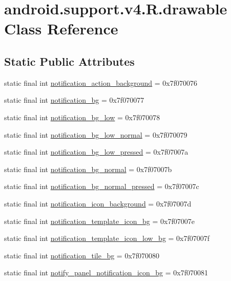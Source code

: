 \hypertarget{classandroid_1_1support_1_1v4_1_1_r_1_1drawable}{}\section{android.\+support.\+v4.\+R.\+drawable Class Reference}
\label{classandroid_1_1support_1_1v4_1_1_r_1_1drawable}
\subsection*{Static Public Attributes}
\begin{DoxyCompactItemize}
\item 
static final int \mbox{\hyperlink{classandroid_1_1support_1_1v4_1_1_r_1_1drawable_a1c5ea12cd4bf083ceae928a72012a29d}{notification\+\_\+action\+\_\+background}} = 0x7f070076
\item 
static final int \mbox{\hyperlink{classandroid_1_1support_1_1v4_1_1_r_1_1drawable_a0d0d6a26167a46b4f5473be51838a398}{notification\+\_\+bg}} = 0x7f070077
\item 
static final int \mbox{\hyperlink{classandroid_1_1support_1_1v4_1_1_r_1_1drawable_ab0f27bdda695d0483467980ff9046e64}{notification\+\_\+bg\+\_\+low}} = 0x7f070078
\item 
static final int \mbox{\hyperlink{classandroid_1_1support_1_1v4_1_1_r_1_1drawable_a1e4034a8000089da45523a4dc7e7d9cc}{notification\+\_\+bg\+\_\+low\+\_\+normal}} = 0x7f070079
\item 
static final int \mbox{\hyperlink{classandroid_1_1support_1_1v4_1_1_r_1_1drawable_a5cf6c1f75adafe5591e10e3f69fbfe97}{notification\+\_\+bg\+\_\+low\+\_\+pressed}} = 0x7f07007a
\item 
static final int \mbox{\hyperlink{classandroid_1_1support_1_1v4_1_1_r_1_1drawable_aaba29d4510a5dd4a4595e2aedb7c4984}{notification\+\_\+bg\+\_\+normal}} = 0x7f07007b
\item 
static final int \mbox{\hyperlink{classandroid_1_1support_1_1v4_1_1_r_1_1drawable_a5307ce5ac425f1c9e26198d2cb916bad}{notification\+\_\+bg\+\_\+normal\+\_\+pressed}} = 0x7f07007c
\item 
static final int \mbox{\hyperlink{classandroid_1_1support_1_1v4_1_1_r_1_1drawable_a15cc24da0548b407fa8a5ebb927077dd}{notification\+\_\+icon\+\_\+background}} = 0x7f07007d
\item 
static final int \mbox{\hyperlink{classandroid_1_1support_1_1v4_1_1_r_1_1drawable_afa9eae4b4d22f976ab7ed0d53cc43d96}{notification\+\_\+template\+\_\+icon\+\_\+bg}} = 0x7f07007e
\item 
static final int \mbox{\hyperlink{classandroid_1_1support_1_1v4_1_1_r_1_1drawable_abdbd483972efa7e83398fbc6174f0e9e}{notification\+\_\+template\+\_\+icon\+\_\+low\+\_\+bg}} = 0x7f07007f
\item 
static final int \mbox{\hyperlink{classandroid_1_1support_1_1v4_1_1_r_1_1drawable_a0131df44a17c930ba8fe4a82cd3be82a}{notification\+\_\+tile\+\_\+bg}} = 0x7f070080
\item 
static final int \mbox{\hyperlink{classandroid_1_1support_1_1v4_1_1_r_1_1drawable_a6ec51c56e3b56f429d97dde6d2b6ebaa}{notify\+\_\+panel\+\_\+notification\+\_\+icon\+\_\+bg}} = 0x7f070081
\end{DoxyCompactItemize}
